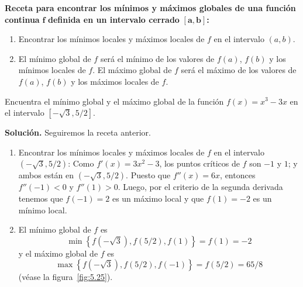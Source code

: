 \documentclass[12pt,a4paper]{book}
\newcommand{\receta}[1]{\par\addvspace{\medskipamount}#1\par\nobreak}
\begin{document}
    \receta{\textbf{Receta para encontrar los mínimos y máximos globales de una función continua} $\boldsymbol{f}$ \textbf{definida en un intervalo cerrado} $\boldsymbol{[a,b]}$\textbf{:}}
    \begin{enumerate}[label=\arabic*.,nosep]
        \item Encontrar los mínimos locales y máximos locales de $f$ en el intervalo $(a,b)$.
        \item El mínimo global de $f$ será el mínimo de los valores de $f(a)$, $f(b)$ y los
        mínimos locales de $f$. El máximo global de $f$ será el máximo de los valores
        de $f(a)$, $f(b)$ y los máximos locales de $f$.
    \end{enumerate}

    \begin{ejemplo}\label{ejm:94}
        Encuentra el mínimo global y el máximo global de la función
        $f(x)=x^{3}-3x$ en el intervalo $\left[-\sqrt{3},5/2\right]$.

        \textbf{Solución.} Seguiremos la receta anterior.
        \begin{enumerate}[label=\arabic*.]
            \item Encontrar los mínimos locales y máximos locales de $f$ en el intervalo
            $\left(-\sqrt{3},5/2\right)$: Como $f'(x)=3x^{2}-3$, los puntos críticos de $f$ son $-1$ y $1$; y
            ambos están en $\left(-\sqrt{3},5/2\right)$. Puesto que $f''(x)=6x$, entonces $f''(-1)<0$
            y $f''(1)>0$. Luego, por el criterio de la segunda derivada tenemos que
            $f(-1)=2$ es un máximo local y que $f(1)=-2$ es un mínimo local.
            \item El mínimo global de $f$ es
            \begin{equation*}
                \min\left\{f\left(-\sqrt{3}\right),f(5/2),f(1)\right\}=f(1)=-2
            \end{equation*}
            y el máximo global de $f$ es
            \begin{equation*}
                \max\left\{f\left(-\sqrt{3}\right),f(5/2),f(-1)\right\}=f(5/2)=65/8
            \end{equation*}
            (véase la figura~\ref{fig:5.25}).\finej
        \end{enumerate}
    \end{ejemplo}
\end{document}
